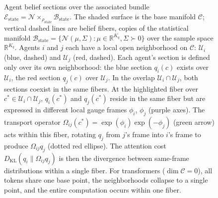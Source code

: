 \documentclass[11pt]{article}
\providecommand{\KL}{\operatorname{KL}}
\begin{document}
\begin{figure}[t]
\caption{%
Agent belief sections over the associated bundle
$\mathcal{E}_{\mathrm{state}} = \mathcal{N} \times_{\rho_{\mathrm{state}}} \mathcal{B}_{\mathrm{state}}$.
The shaded surface is the base manifold $\mathcal{C}$;
vertical dashed lines are belief fibers, copies of the statistical manifold
$\mathcal{B}_{\mathrm{state}} = \{\mathcal{N}(\mu, \Sigma) : \mu \in \mathbb{R}^{K_q}, \Sigma \succ 0\}$
over the sample space $\mathbb{R}^{K_q}$.
Agents $i$ and $j$ each have a local open neighborhood on $\mathcal{C}$:
$\mathcal{U}_i$ (blue, dashed) and $\mathcal{U}_j$ (red, dashed).
Each agent's section is defined only over its own neighborhood:
the blue section $q_i(c)$ exists over $\mathcal{U}_i$,
the red section $q_j(c)$ over $\mathcal{U}_j$.
In the overlap $\mathcal{U}_i \cap \mathcal{U}_j$,
both sections coexist in the same fibers.
At the highlighted fiber over $c^* \in \mathcal{U}_i \cap \mathcal{U}_j$,
$q_i(c^*)$ and $q_j(c^*)$ reside in the same fiber
but are expressed in different local gauge frames
$\phi_i$, $\phi_j$ (purple axes).
The transport operator
$\Omega_{ij}(c^*) = \exp(\phi_i)\exp(-\phi_j)$
(green arrow) acts within this fiber,
rotating $q_j$ from $j$'s frame into $i$'s frame
to produce $\Omega_{ij} q_j$ (dotted red ellipse).
The attention cost $D_{\mathrm{KL}}(q_i \| \Omega_{ij} q_j)$
is then the divergence between same-frame distributions within a single fiber.
For transformers ($\dim\mathcal{C} = 0$),
all tokens share one base point, the neighborhoods collapse to a single point,
and the entire computation occurs within one fiber.
}
\label{fig:bundle_sections_surface}
\end{figure}
\end{document}
